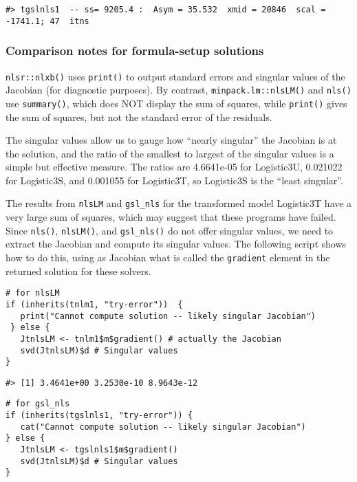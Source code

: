 \begin{verbatim}
#> tgslnls1  -- ss= 9205.4 :  Asym = 35.532  xmid = 20846  scal = -1741.1; 47  itns
\end{verbatim}

\hypertarget{comparison-notes-for-formula-setup-solutions}{%
\subsubsection{Comparison notes for formula-setup solutions}\label{comparison-notes-for-formula-setup-solutions}}

\texttt{nlsr::nlxb()} uses \texttt{print()} to output standard errors and
singular values of the Jacobian (for diagnostic purposes). By contrast,
\texttt{minpack.lm::nlsLM()} and \texttt{nls()}
use \texttt{summary()}, which does NOT display the sum of squares, while \texttt{print()}
gives the sum of squares, but not the standard error of the residuals.

The singular values allow us to gauge how ``nearly singular'' the
Jacobian is at the solution, and the ratio of the smallest to largest of the
singular values is a simple but effective measure. The ratios are
4.6641e-05 for Logistic3U, 0.021022 for Logistic3S, and 0.001055 for
Logistic3T, so Logistic3S is the ``least singular''.

The results from \texttt{nlsLM} and \texttt{gsl\_nls} for the transformed model Logistic3T have a very
large sum of squares, which may suggest that these programs have failed.
Since \texttt{nls()}, \texttt{nlsLM()}, and \texttt{gsl\_nls()} do not
offer singular values, we need to extract the Jacobian and compute its
singular values. The following script shows how to do this, using as Jacobian what is called
the \texttt{gradient} element in the returned solution for these solvers.

\begin{verbatim}
# for nlsLM
if (inherits(tnlm1, "try-error"))  {
   print("Cannot compute solution -- likely singular Jacobian")
 } else {  
   JtnlsLM <- tnlm1$m$gradient() # actually the Jacobian
   svd(JtnlsLM)$d # Singular values
}   
\end{verbatim}

\begin{verbatim}
#> [1] 3.4641e+00 3.2530e-10 8.9643e-12
\end{verbatim}

\begin{verbatim}
# for gsl_nls
if (inherits(tgslnls1, "try-error")) {
   cat("Cannot compute solution -- likely singular Jacobian")
} else {  
   JtnlsLM <- tgslnls1$m$gradient()
   svd(JtnlsLM)$d # Singular values
}   
\end{verbatim}

